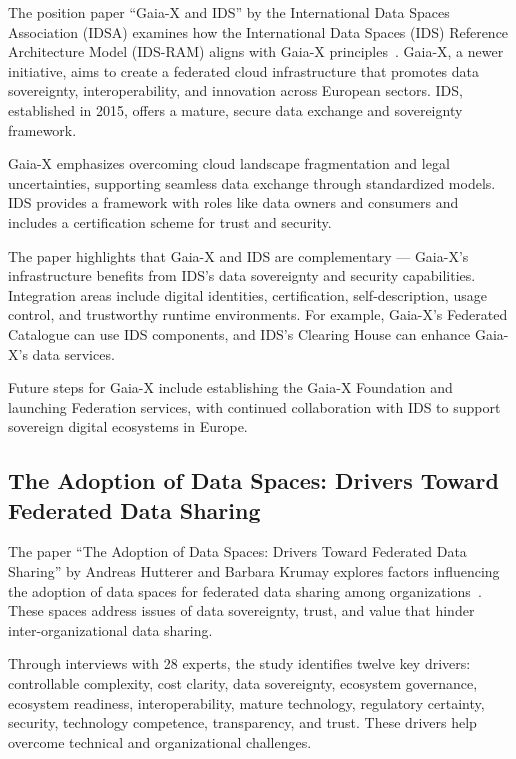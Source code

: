 The position paper ``Gaia-X and IDS'' by the International Data Spaces Association (IDSA) examines how the International Data Spaces (IDS) Reference Architecture Model (IDS-RAM) aligns with Gaia-X principles~\cite{gaiax_and_ids}.
Gaia-X, a newer initiative, aims to create a federated cloud infrastructure that promotes data sovereignty, interoperability, and innovation across European sectors.
IDS, established in 2015, offers a mature, secure data exchange and sovereignty framework.

Gaia-X emphasizes overcoming cloud landscape fragmentation and legal uncertainties, supporting seamless data exchange through standardized models.
IDS provides a framework with roles like data owners and consumers and includes a certification scheme for trust and security.

The paper highlights that Gaia-X and IDS are complementary --- Gaia-X's infrastructure benefits from IDS's data sovereignty and security capabilities.
Integration areas include digital identities, certification, self-description, usage control, and trustworthy runtime environments.
For example, Gaia-X's Federated Catalogue can use IDS components, and IDS's Clearing House can enhance Gaia-X's data services.

Future steps for Gaia-X include establishing the Gaia-X Foundation and launching Federation services, with continued collaboration with IDS to support sovereign digital ecosystems in Europe.

\subsection[The Adoption of Data Spaces]{The Adoption of Data Spaces: Drivers Toward Federated Data Sharing}\label{subsec:the-adoption-of-data-spaces:-drivers-toward-federated-data-sharing}

The paper ``The Adoption of Data Spaces: Drivers Toward Federated Data Sharing'' by Andreas Hutterer and Barbara Krumay explores factors influencing the adoption of data spaces for federated data sharing among organizations~\cite{adoption_of_data_spaces}.
These spaces address issues of data sovereignty, trust, and value that hinder inter-organizational data sharing.

Through interviews with 28 experts, the study identifies twelve key drivers: controllable complexity, cost clarity, data sovereignty, ecosystem governance, ecosystem readiness, interoperability, mature technology, regulatory certainty, security, technology competence, transparency, and trust.
These drivers help overcome technical and organizational challenges.

